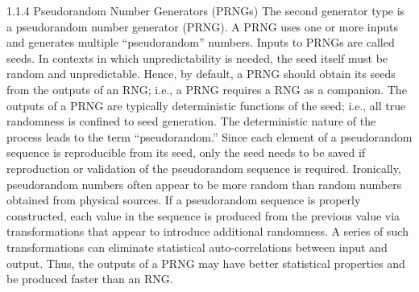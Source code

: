 1.1.4 Pseudorandom Number Generators (PRNGs)
The second generator type is a pseudorandom number generator (PRNG). A PRNG uses one or more inputs and generates multiple “pseudorandom” numbers. Inputs to PRNGs are called seeds. In contexts in which unpredictability is needed, the seed itself must be random and unpredictable. Hence, by default, a PRNG should obtain its seeds from the outputs of an RNG; i.e., a PRNG requires a RNG as a companion. The outputs of a PRNG are typically deterministic functions of the seed; i.e., all true randomness is confined to seed generation. The deterministic nature of the process leads to the term “pseudorandom.” Since each element of a pseudorandom sequence is reproducible from its seed, only the seed needs to be saved if reproduction or validation of the pseudorandom sequence is required. Ironically, pseudorandom numbers often appear to be more random than random numbers obtained from physical sources. If a pseudorandom sequence is properly constructed, each value in the sequence is produced from the previous value via transformations that appear to introduce additional randomness. A series of such transformations can eliminate statistical auto-correlations between input and output. Thus, the outputs of a PRNG may have better statistical properties and be produced faster than an RNG.  

